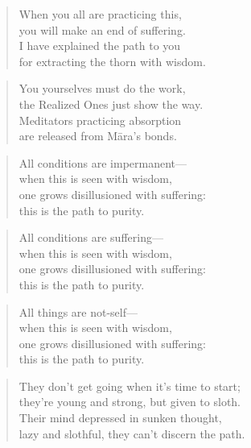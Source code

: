 \documentclass[12pt,openany]{book}%
\begin{document}
\begin{verse}%
When you all are practicing this, \\
you will make an end of suffering. \\
I have explained the path to you \\
for extracting the thorn with wisdom. 

%
\end{verse}

\begin{verse}%
You yourselves must do the work, \\
the Realized Ones just show the way. \\
Meditators practicing absorption \\
are released from \textsanskrit{Māra}’s bonds. 

%
\end{verse}

\begin{verse}%
All conditions are impermanent—\\
when this is seen with wisdom, \\
one grows disillusioned with suffering: \\
this is the path to purity. 

%
\end{verse}

\begin{verse}%
All conditions are suffering—\\
when this is seen with wisdom, \\
one grows disillusioned with suffering: \\
this is the path to purity. 

%
\end{verse}

\begin{verse}%
All things are not-self—\\
when this is seen with wisdom, \\
one grows disillusioned with suffering: \\
this is the path to purity. 

%
\end{verse}

\begin{verse}%
They don’t get going when it’s time to start; \\
they’re young and strong, but given to sloth. \\
Their mind depressed in sunken thought, \\
lazy and slothful, they can’t discern the path. 

%
\end{verse}
\end{document}
